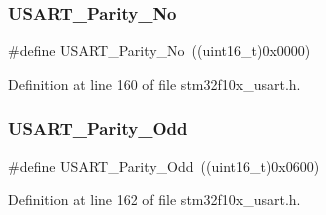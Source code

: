 \subsubsection{\texorpdfstring{U\+S\+A\+R\+T\+\_\+\+Parity\+\_\+\+No}{USART\_Parity\_No}}
{\footnotesize\ttfamily \#define U\+S\+A\+R\+T\+\_\+\+Parity\+\_\+\+No~((uint16\+\_\+t)0x0000)}



Definition at line 160 of file stm32f10x\+\_\+usart.\+h.

\mbox{\label{group___u_s_a_r_t___parity_gafcd68937a6b4b8ffff8f96e68d6a5ecd}} 
\subsubsection{\texorpdfstring{U\+S\+A\+R\+T\+\_\+\+Parity\+\_\+\+Odd}{USART\_Parity\_Odd}}
{\footnotesize\ttfamily \#define U\+S\+A\+R\+T\+\_\+\+Parity\+\_\+\+Odd~((uint16\+\_\+t)0x0600)}



Definition at line 162 of file stm32f10x\+\_\+usart.\+h.

